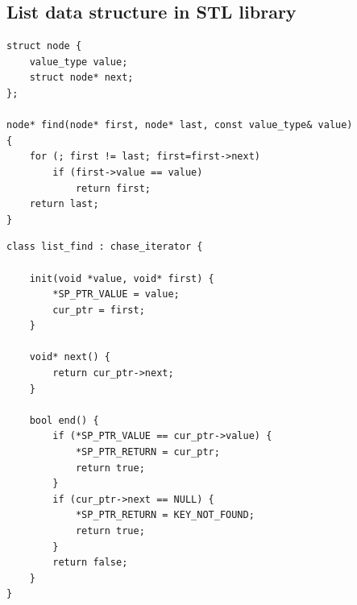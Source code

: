\lstset{frame=tb,
  xleftmargin=0cm,
  linewidth=0.95\textwidth
}
\captionsetup[lstlisting]{style=centered_lstlisting}

\vspace{2em}

\begin{minipage}{0.47\textwidth}
\subsection{List data structure in STL library}
\centering
\begin{lstlisting}[caption={C++ STL realization for \code{std::find()}},label={lst:list}, captionpos=t]
struct node {
    value_type value;
    struct node* next;
};

node* find(node* first, node* last, const value_type& value)
{
    for (; first != last; first=first->next)
        if (first->value == value)
            return first;
    return last;
}
\end{lstlisting}

\begin{lstlisting}[caption={\name realization for \code{std::find()}},label={lst:list_mod}, captionpos=t]
class list_find : chase_iterator {

    init(void *value, void* first) {
        *SP_PTR_VALUE = value;
        cur_ptr = first;
    }
  
    void* next() {
        return cur_ptr->next;
    }
  
    bool end() {
        if (*SP_PTR_VALUE == cur_ptr->value) {
            *SP_PTR_RETURN = cur_ptr;  
            return true;
        }
        if (cur_ptr->next == NULL) {
            *SP_PTR_RETURN = KEY_NOT_FOUND;  
            return true;
        }
        return false;
    }
}
\end{lstlisting}
\end{minipage}


